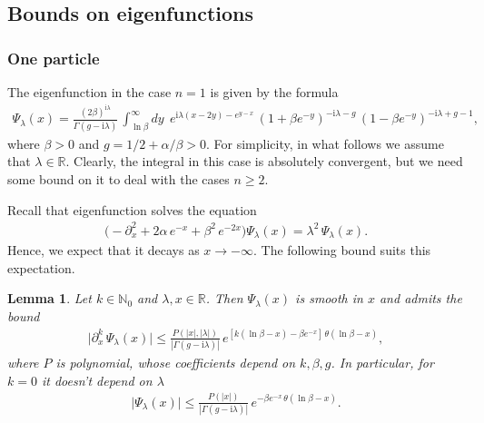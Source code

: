 \documentclass[11pt]{article}
\numberwithin{equation}{section}
\theoremstyle{plain}
\newtheorem{lemma}{Lemma}
\theoremstyle{definition}
\renewcommand{\imath}{\mathrm{i}}
\begin{document}
\subsection{Bounds on eigenfunctions} \label{sec:bounds-eigen}

\subsubsection{One particle}

The eigenfunction in the case $n = 1$ is given by the formula
\begin{align}\label{Psi}
	\Psi_\lambda(x) = \frac{(2\beta)^{\imath \lambda}}{\Gamma(g - \imath \lambda)} \, \int_{\ln \beta}^\infty dy \;\, e^{\imath \lambda (x - 2y) - e^{y - x}} \, (1 + \beta e^{-y})^{- \imath \lambda - g} \, (1 - \beta e^{-y})^{-\imath \lambda + g - 1},
\end{align}
where $\beta > 0$ and $g = 1/2 + \alpha/\beta > 0$. For simplicity, in what follows we assume that $\lambda \in \mathbb{R}$. Clearly, the integral in this case is absolutely convergent, but we need some bound on it to deal with the cases $n \geq 2$.

Recall that eigenfunction solves the equation
\begin{align}
	\bigl( -\partial_x^2 + 2\alpha \, e^{-x} + \beta^2 \, e^{-2x} \bigr) \Psi_\lambda(x) = \lambda^2 \, \Psi_\lambda(x).
\end{align}
Hence, we expect that it decays as \mbox{$x \to -\infty$}. The following bound suits this expectation.

\begin{lemma}\label{lemma4}
	Let $k \in \mathbb{N}_0$ and $\lambda, x\in \mathbb{R}$. Then $\Psi_\lambda(x)$ is smooth in $x$ and admits the bound
	\begin{align}
		\bigl| \partial_x^k \, \Psi_\lambda(x) \bigr| \leq \frac{P(|x|, |\lambda|)}{| \Gamma(g - \imath \lambda) |} \, e^{ [k (\ln \beta - x) - \beta e^{-x} ] \, \theta(\ln\beta-x)},
	\end{align}
	where $P$ is polynomial, whose coefficients depend on $k, \beta, g$. In particular, for $k = 0$ it doesn't depend on $\lambda$
	\begin{align}\label{Psi0-b}
		\bigl| \Psi_\lambda(x) \bigr| \leq \frac{P(|x|)}{| \Gamma(g - \imath \lambda) |} \, e^{ -  \beta e^{-x} \, \theta(\ln\beta-x)}.
	\end{align}
\end{lemma}
\end{document}
